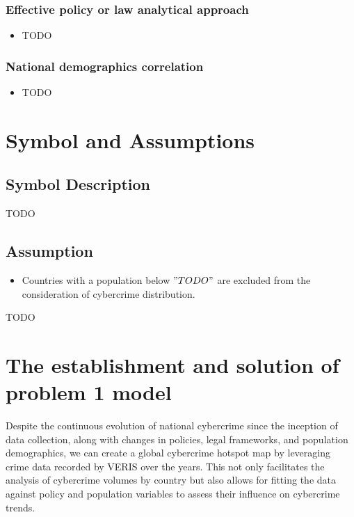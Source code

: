 \documentclass[12pt]{article}
\begin{document}
		\subsubsection[]{Effective policy or law analytical approach} %
			\begin{itemize}
				\item TODO %
			\end{itemize}
		\subsubsection[]{National demographics correlation} %
			\begin{itemize}
				\item TODO %
			\end{itemize}
	
\section{Symbol and Assumptions}\label{sec:symbol-and-assumptions} %
	\subsection{Symbol Description}\label{subsec:symbol-description} %
		TODO %
	\subsection{Assumption}\label{subsec:assumption} %
		\begin{itemize}
			\item Countries with a population below \( "TODO" \) are excluded from the consideration of cybercrime distribution.
		\end{itemize}
		TODO %

\section{The establishment and solution of problem 1 model}\label{sec:the-establishment-and-solution-of-problem-1-model} %
	Despite the continuous evolution of national cybercrime since the inception of data collection,
	along with changes in policies, legal frameworks, and population demographics,
	we can create a global cybercrime hotspot map by leveraging crime data recorded by VERIS over the years.
	This not only facilitates the analysis of cybercrime volumes by country
	but also allows for fitting the data against policy and population variables to assess their influence on cybercrime trends.
\end{document}
